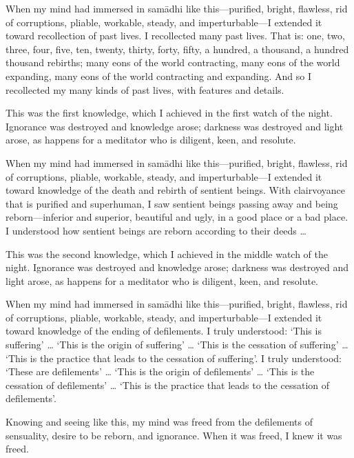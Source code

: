 \documentclass[12pt,openany]{book}%
\begin{document}
When my mind had immersed in \textsanskrit{samādhi} like this—purified, bright, flawless, rid of corruptions, pliable, workable, steady, and imperturbable—I extended it toward recollection of past lives. I recollected many past lives. That is: one, two, three, four, five, ten, twenty, thirty, forty, fifty, a hundred, a thousand, a hundred thousand rebirths; many eons of the world contracting, many eons of the world expanding, many eons of the world contracting and expanding. And so I recollected my many kinds of past lives, with features and details. 

This was the first knowledge, which I achieved in the first watch of the night. Ignorance was destroyed and knowledge arose; darkness was destroyed and light arose, as happens for a meditator who is diligent, keen, and resolute. 

When my mind had immersed in \textsanskrit{samādhi} like this—purified, bright, flawless, rid of corruptions, pliable, workable, steady, and imperturbable—I extended it toward knowledge of the death and rebirth of sentient beings. With clairvoyance that is purified and superhuman, I saw sentient beings passing away and being reborn—inferior and superior, beautiful and ugly, in a good place or a bad place. I understood how sentient beings are reborn according to their deeds … 

This was the second knowledge, which I achieved in the middle watch of the night. Ignorance was destroyed and knowledge arose; darkness was destroyed and light arose, as happens for a meditator who is diligent, keen, and resolute. 

When my mind had immersed in \textsanskrit{samādhi} like this—purified, bright, flawless, rid of corruptions, pliable, workable, steady, and imperturbable—I extended it toward knowledge of the ending of defilements. I truly understood: ‘This is suffering’ … ‘This is the origin of suffering’ … ‘This is the cessation of suffering’ … ‘This is the practice that leads to the cessation of suffering’. I truly understood: ‘These are defilements’ … ‘This is the origin of defilements’ … ‘This is the cessation of defilements’ … ‘This is the practice that leads to the cessation of defilements’. 

Knowing and seeing like this, my mind was freed from the defilements of sensuality, desire to be reborn, and ignorance. When it was freed, I knew it was freed. 
\end{document}
